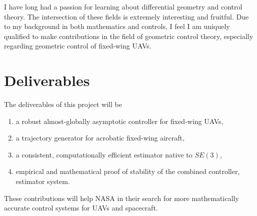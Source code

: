\documentclass[letterpaper, 10 pt, conference]{ieeeconf}  %
\begin{document}
I have long had a passion for learning about differential geometry and control theory. The intersection of these fields is extremely interesting and fruitful. Due to my background in both mathematics and controls, I feel I am uniquely qualified to make contributions in the field of geometric control theory, especially regarding geometric control of fixed-wing UAVs.

\section{Deliverables}%
The deliverables of this project will be
\begin{enumerate}
  \item a robust almost-globally asymptotic controller for fixed-wing UAVs,
  \item a trajectory generator for acrobatic fixed-wing aircraft,
  \item a consistent, computationally efficient estimator native to $SE(3)$,
  \item empirical and mathematical proof of stability of the combined controller, estimator system.
\end{enumerate}
These contributions will help NASA in their search for more mathematically accurate control systems for UAVs and spacecraft.


 

\end{document}
